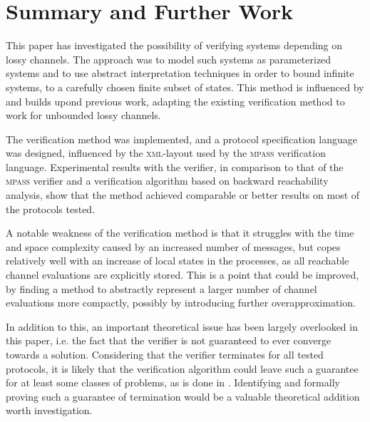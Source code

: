 \section{Summary and Further Work}
This paper has investigated the possibility of verifying systems depending on lossy channels. The approach was to model such systems as parameterized systems and to use abstract interpretation techniques in order to bound infinite systems, to a carefully chosen finite subset of states. This method is influenced by and builds upond previous work\cite{parosh}, adapting the existing verification method to work for unbounded lossy channels.

The verification method was implemented, and a protocol specification language was designed, influenced by the \textsc{xml}-layout used by the \textsc{mpass} verification language\cite{mpass}. Experimental results with the verifier, in comparison to that of the \textsc{mpass} verifier and a verification algorithm based on backward reachability analysis\cite{287591}, show that the method achieved comparable or better results on most of the protocols tested.

A notable weakness of the verification method is that it struggles with the time and space complexity caused by an increased number of messages, but copes relatively well with an increase of local states in the processes, as all reachable channel evaluations are explicitly stored. This is a point that could be improved, by finding a method to abstractly represent a larger number of channel evaluations more compactly, possibly by introducing further overapproximation.

In addition to this, an important theoretical issue has been largely overlooked in this paper, i.e. the fact that the verifier is not guaranteed to ever converge towards a solution. Considering that the verifier terminates for all tested protocols, it is likely that the verification algorithm could leave such a guarantee for at least some classes of problems, as is done in \cite{parosh}. Identifying and formally proving such a guarantee of termination would be a valuable theoretical addition worth investigation.
